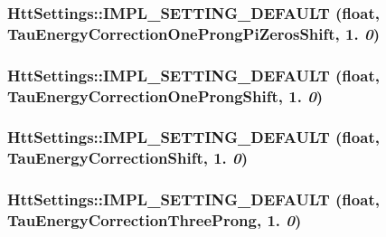 \label{classHttSettings_a274ad9b3c532a2893ed7d361d9080892}
\hypertarget{classHttSettings_aa2da7ce271caf09424e162bde62b803c}{
\subsubsection[{IMPL\_\-SETTING\_\-DEFAULT}]{\setlength{\rightskip}{0pt plus 5cm}HttSettings::IMPL\_\-SETTING\_\-DEFAULT (float, \/  TauEnergyCorrectionOneProngPiZerosShift, \/  1. {\em 0})}}
\label{classHttSettings_aa2da7ce271caf09424e162bde62b803c}
\hypertarget{classHttSettings_a96b8aa1d1077cae74ccf8ad95db1b91e}{
\subsubsection[{IMPL\_\-SETTING\_\-DEFAULT}]{\setlength{\rightskip}{0pt plus 5cm}HttSettings::IMPL\_\-SETTING\_\-DEFAULT (float, \/  TauEnergyCorrectionOneProngShift, \/  1. {\em 0})}}
\label{classHttSettings_a96b8aa1d1077cae74ccf8ad95db1b91e}
\hypertarget{classHttSettings_a888c120dedf0435ff3a7cdad154bbf6f}{
\subsubsection[{IMPL\_\-SETTING\_\-DEFAULT}]{\setlength{\rightskip}{0pt plus 5cm}HttSettings::IMPL\_\-SETTING\_\-DEFAULT (float, \/  TauEnergyCorrectionShift, \/  1. {\em 0})}}
\label{classHttSettings_a888c120dedf0435ff3a7cdad154bbf6f}
\hypertarget{classHttSettings_a9fc6f8e7febeed96c0e22ae57594b3e3}{
\subsubsection[{IMPL\_\-SETTING\_\-DEFAULT}]{\setlength{\rightskip}{0pt plus 5cm}HttSettings::IMPL\_\-SETTING\_\-DEFAULT (float, \/  TauEnergyCorrectionThreeProng, \/  1. {\em 0})}}
\label{classHttSettings_a9fc6f8e7febeed96c0e22ae57594b3e3}
